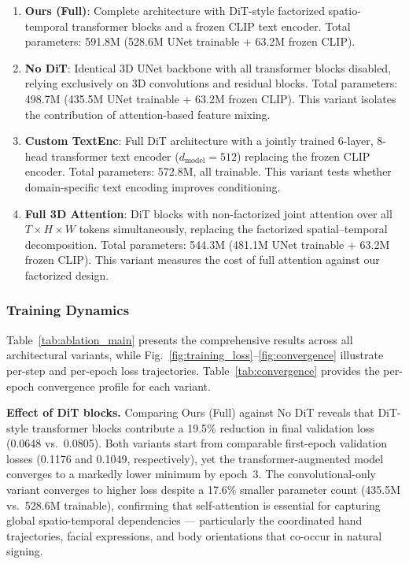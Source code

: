 \documentclass{ieeeaccess}
\begin{document}
\begin{enumerate}
    \item \textbf{Ours (Full)}: Complete architecture with DiT-style factorized spatio-temporal transformer blocks and a frozen CLIP text encoder. Total parameters: 591.8M (528.6M UNet trainable + 63.2M frozen CLIP).
    \item \textbf{No DiT}: Identical 3D UNet backbone with all transformer blocks disabled, relying exclusively on 3D convolutions and residual blocks. Total parameters: 498.7M (435.5M UNet trainable + 63.2M frozen CLIP). This variant isolates the contribution of attention-based feature mixing.
    \item \textbf{Custom TextEnc}: Full DiT architecture with a jointly trained 6-layer, 8-head transformer text encoder ($d_{\mathrm{model}}=512$) replacing the frozen CLIP encoder. Total parameters: 572.8M, all trainable. This variant tests whether domain-specific text encoding improves conditioning.
    \item \textbf{Full 3D Attention}: DiT blocks with non-factorized joint attention over all $T \times H \times W$ tokens simultaneously, replacing the factorized spatial--temporal decomposition. Total parameters: 544.3M (481.1M UNet trainable + 63.2M frozen CLIP). This variant measures the cost of full attention against our factorized design.
\end{enumerate}

\subsubsection{Training Dynamics}

Table~\ref{tab:ablation_main} presents the comprehensive results across all architectural variants, while Fig.~\ref{fig:training_loss}--\ref{fig:convergence} illustrate per-step and per-epoch loss trajectories. Table~\ref{tab:convergence} provides the per-epoch convergence profile for each variant.

\textbf{Effect of DiT blocks.} Comparing Ours (Full) against No DiT reveals that DiT-style transformer blocks contribute a 19.5\% reduction in final validation loss (0.0648 vs.\ 0.0805). Both variants start from comparable first-epoch validation losses (0.1176 and 0.1049, respectively), yet the transformer-augmented model converges to a markedly lower minimum by epoch~3. The convolutional-only variant converges to higher loss despite a 17.6\% smaller parameter count (435.5M vs.\ 528.6M trainable), confirming that self-attention is essential for capturing global spatio-temporal dependencies — particularly the coordinated hand trajectories, facial expressions, and body orientations that co-occur in natural signing.
\end{document}
